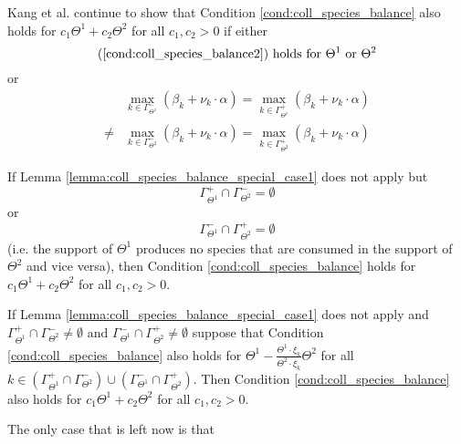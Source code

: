 \documentclass[english]{article}
\begin{document}
\begin{lemma}
\label{lemma:coll_species_balance_special_case1}
Kang et al. continue to show that Condition
\ref{cond:coll_species_balance} also holds for
$c_{1} \Theta^{1} + c_{2} \Theta^{2}$ for all $c_{1},c_{2} > 0$ if
either
\[
    \mbox{(\ref{cond:coll_species_balance2}) holds for } \Theta^1
    \mbox{ or } \Theta^2
\]
or
\begin{align*}
    & \underset{k \in \Gamma_{\Theta^{1}}^{-}}{\max} \left(
		\beta_{k} + \nu_{k} \cdot \alpha
	\right)
	= \underset{k \in \Gamma_{\Theta^{1}}^{+}}{\max} \left(
		\beta_{k} + \nu_{k} \cdot \alpha
	\right) \\
    \neq & \underset{k \in \Gamma_{\Theta^{2}}^{-}}{\max} \left(
		\beta_{k} + \nu_{k} \cdot \alpha
	\right)
	= \underset{k \in \Gamma_{\Theta^{2}}^{+}}{\max} \left(
		\beta_{k} + \nu_{k} \cdot \alpha
	\right)
\end{align*}
\end{lemma}



\begin{lemma}
\label{lemma:coll_species_balance_special_case2}
If Lemma \ref{lemma:coll_species_balance_special_case1} does not
apply but
\[
    \Gamma_{\Theta^{1}}^{+} \cap \Gamma_{\Theta^{2}}^{-} = \emptyset
\]
or
\[
    \Gamma_{\Theta^{1}}^{-} \cap \Gamma_{\Theta^{2}}^{+} = \emptyset
\]
(i.e. the support of $\Theta^{1}$ produces no species that are
consumed in the support of $\Theta^{2}$ and vice versa),
then Condition \ref{cond:coll_species_balance} holds for
$c_{1} \Theta^{1} + c_{2} \Theta^{2}$ for all $c_{1}, c_{2} > 0$.
\end{lemma}

\begin{lemma}
\label{lemma:coll_species_balance_special_case3}
If Lemma \ref{lemma:coll_species_balance_special_case1} does not
apply and
$\Gamma_{\Theta^{1}}^{+} \cap \Gamma_{\Theta^{2}}^{-} \neq \emptyset$
and
$\Gamma_{\Theta^{1}}^{-} \cap \Gamma_{\Theta^{2}}^{+} \neq \emptyset$
suppose that Condition \ref{cond:coll_species_balance} also holds for
$\Theta^1 - \frac{\Theta^1 \cdot \xi_k}{\Theta^2 \cdot \xi_k} \Theta^2$
for all $k \in \left(
	\Gamma_{\Theta^1}^+ \cap \Gamma_{\Theta^2}^-
\right) \cup \left(
	\Gamma_{\Theta^1}^- \cap \Gamma_{\Theta^2}^{+}
\right)$.
Then Condition \ref{cond:coll_species_balance} also holds for
$c_1 \Theta^1 + c_2 \Theta^2$ for all $c_1, c_2 > 0$.
\end{lemma}

The only case that is left now is that
\end{document}

